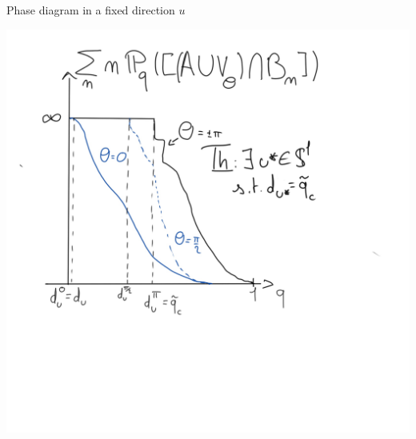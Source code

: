 \begin{frame}{Phase diagram in a fixed direction $u$}
	\begin{center}
    	 \includegraphics[width=\textwidth]{decay_theta.jpg}
	\end{center}

\end{frame}

